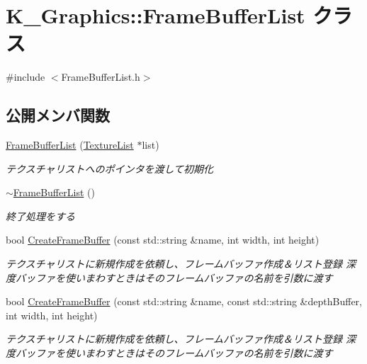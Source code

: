 \hypertarget{class_k___graphics_1_1_frame_buffer_list}{}\section{K\+\_\+\+Graphics\+:\+:Frame\+Buffer\+List クラス}
\label{class_k___graphics_1_1_frame_buffer_list}


{\ttfamily \#include $<$Frame\+Buffer\+List.\+h$>$}

\subsection*{公開メンバ関数}
\begin{DoxyCompactItemize}
\item 
\mbox{\hyperlink{class_k___graphics_1_1_frame_buffer_list_adde18222008a5b4d2962b6432c9eea4f}{Frame\+Buffer\+List}} (\mbox{\hyperlink{class_k___graphics_1_1_texture_list}{Texture\+List}} $\ast$list)
\begin{DoxyCompactList}\small\item\em テクスチャリストへのポインタを渡して初期化 \end{DoxyCompactList}\item 
\mbox{\hyperlink{class_k___graphics_1_1_frame_buffer_list_a0e7f1925dd1ae7b506cab0d023438552}{$\sim$\+Frame\+Buffer\+List}} ()
\begin{DoxyCompactList}\small\item\em 終了処理をする \end{DoxyCompactList}\item 
bool \mbox{\hyperlink{class_k___graphics_1_1_frame_buffer_list_a21a4bff7e956835548565d9b46c031b5}{Create\+Frame\+Buffer}} (const std\+::string \&name, int width, int height)
\begin{DoxyCompactList}\small\item\em テクスチャリストに新規作成を依頼し、フレームバッファ作成＆リスト登録 深度バッファを使いまわすときはそのフレームバッファの名前を引数に渡す \end{DoxyCompactList}\item 
bool \mbox{\hyperlink{class_k___graphics_1_1_frame_buffer_list_a0ba074b9922c099102a43e92b6815d4c}{Create\+Frame\+Buffer}} (const std\+::string \&name, const std\+::string \&depth\+Buffer, int width, int height)
\begin{DoxyCompactList}\small\item\em テクスチャリストに新規作成を依頼し、フレームバッファ作成＆リスト登録 深度バッファを使いまわすときはそのフレームバッファの名前を引数に渡す \end{DoxyCompactList}\item 

\end{DoxyCompactItemize}
